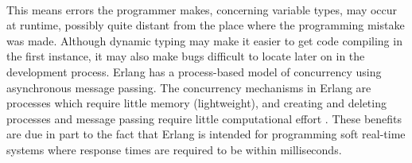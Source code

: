 \documentclass[main.tex]{subfiles}
\begin{document}
\paragraph{}This means errors the programmer makes, concerning variable types, may occur at runtime, possibly quite distant from the place where the programming mistake was made. Although dynamic typing  may make it easier to get code compiling in the first instance, it may also make bugs difficult to locate later on in the development process. Erlang has a process-based model of concurrency using asynchronous message passing. The concurrency mechanisms in Erlang are processes which require little memory (lightweight), and creating and deleting processes and message passing require little computational effort \cite{Armstrong1995}. These benefits are due in part to the fact that Erlang is intended for programming soft real-time systems where response times are required to be within milliseconds.
\end{document}
